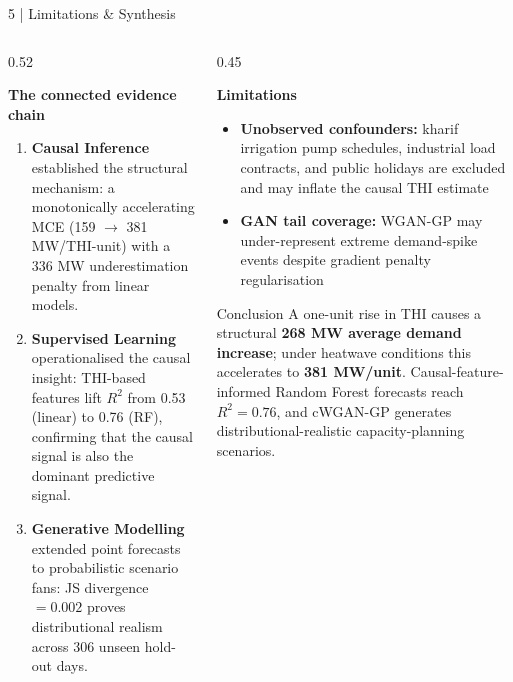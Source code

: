 \documentclass[aspectratio=169, 10pt]{beamer}
\begin{document}
\begin{frame}{5 \;|\; Limitations \& Synthesis}

\begin{columns}[T]
\begin{column}{0.52\textwidth}

\textbf{The connected evidence chain}

\begin{enumerate}
  \item \textbf{Causal Inference} established the structural mechanism:
        a monotonically accelerating MCE (159 $\to$ 381 MW/THI-unit)
        with a 336 MW underestimation penalty from linear models.
  \item \textbf{Supervised Learning} operationalised the causal insight:
        THI-based features lift $R^2$ from 0.53 (linear) to 0.76 (RF),
        confirming that the causal signal is also the dominant predictive signal.
  \item \textbf{Generative Modelling} extended point forecasts to probabilistic
        scenario fans: JS divergence $= 0.002$ proves distributional realism
        across 306 unseen hold-out days.
\end{enumerate}


\end{column}
\begin{column}{0.45\textwidth}

\textbf{Limitations}

\begin{itemize}
  \item \textbf{Unobserved confounders:} kharif irrigation pump schedules,
        industrial load contracts, and public holidays are excluded and
        may inflate the causal THI estimate

  \item \textbf{GAN tail coverage:} WGAN-GP may under-represent extreme
        demand-spike events despite gradient penalty regularisation
 
\end{itemize}
\vspace{-.6 em}
\begin{alertblock}{Conclusion}
\small
A one-unit rise in THI causes a structural \textbf{268 MW average demand
increase}; under heatwave conditions this accelerates to \textbf{381 MW/unit}.
Causal-feature-informed Random Forest forecasts reach $R^2 = 0.76$, and
cWGAN-GP generates distributional-realistic capacity-planning scenarios.
\end{alertblock}
\end{column}
\end{columns}

\end{frame}
\end{document}
